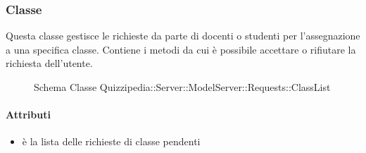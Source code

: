 \subsubsection{Classe }
Questa classe gestisce le richieste da parte di docenti o studenti per l'assegnazione a una specifica classe. Contiene i metodi da cui è possibile accettare o rifiutare la richiesta dell'utente.
\begin{figure}[H]
\centering
\noindent{}
\caption[Schema Classe ClassList]{Schema Classe Quizzipedia::Server::ModelServer::Requests::ClassList}
\end{figure}
\paragraph{Attributi}
\begin{itemize}
\item {}
\newline
è la lista delle richieste di classe pendenti
\end{itemize}
